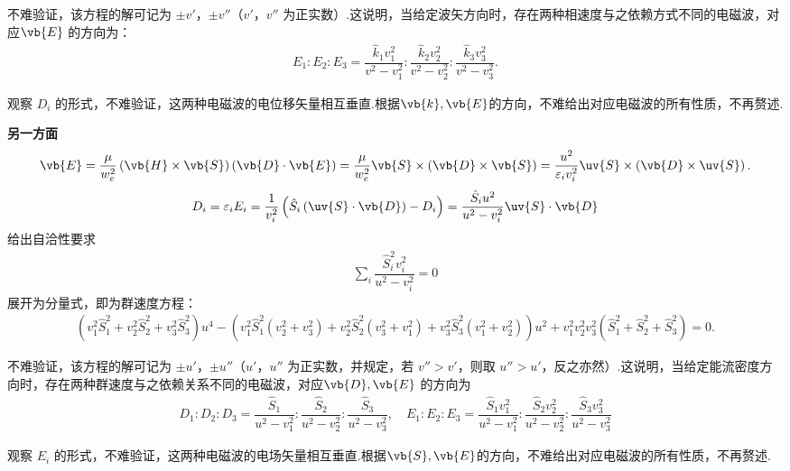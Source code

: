 不难验证，该方程的解可记为 \(\pm v'\)，\(\pm v''\)（\(v'\)，\(v''\) 为正实数）.这说明，当给定波矢方向时，存在两种相速度与之依赖方式不同的电磁波，对应\(\vb{E}\) 的方向为：
\begin{align*}
	E_1 : E_2 : E_3 = \dfrac{\hat{k}_1 v_1^2}{v^2 - v_1^2} : \dfrac{\hat{k}_2 v_2^2}{v^2 - v_2^2} : \dfrac{\hat{k}_3 v_3^2}{v^2 - v_3^2}.
\end{align*}

观察 \(D_i\) 的形式，不难验证，这两种电磁波的电位移矢量相互垂直.根据\(\vb{k},\vb{E}\)的方向，不难给出对应电磁波的所有性质，不再赘述.

\textbf{另一方面}
\begin{align*}
	\vb{E} = \dfrac{\mu}{w_e^2} \left( \vb{H} \times \vb{S} \right) \left( \vb{D} \cdot \vb{E} \right) = \dfrac{\mu}{w_e^2} \vb{S} \times \left( \vb{D} \times \vb{S} \right) = \dfrac{u^2}{\varepsilon_i v_i^2} \uv{S} \times \left( \vb{D} \times \uv{S} \right).
\end{align*}
\begin{align*}
	D_i = \varepsilon_i E_i = \dfrac{1}{v_i^2 }\left(\hat{S}_i\left(\uv{S}\cdot\vb{D}\right)-D_i\right)= \dfrac{\hat{S}_i u^2}{u^2 - v_i^2} \uv{S} \cdot \vb{D}
\end{align*}
给出自洽性要求
\begin{align*}
	\sum_i \dfrac{\hat{S}_i^2 v_i^2}{u^2 - v_i^2} = 0
\end{align*}
展开为分量式，即为群速度方程：
\begin{align*}
	\left( v_1^2 \hat{S}_1^2 + v_2^2 \hat{S}_2^2 + v_3^2 \hat{S}_3^2 \right) u^4 - \left( v_1^2 \hat{S}_1^2 \left(v_2^2 + v_3^2\right) + v_2^2 \hat{S}_2^2 \left(v_3^2 + v_1^2\right) + v_3^2 \hat{S}_3^2 \left(v_1^2 + v_2^2\right) \right) u^2 + v_1^2 v_2^2 v_3^2 \left( \hat{S}_1^2 + \hat{S}_2^2 + \hat{S}_3^2 \right) = 0.
\end{align*}

不难验证，该方程的解可记为 \(\pm u'\)，\(\pm u''\)（\(u'\)，\(u''\) 为正实数，并规定，若 \(v'' > v'\)，则取 \(u'' > u'\)，反之亦然）.这说明，当给定能流密度方向时，存在两种群速度与之依赖关系不同的电磁波，对应\(\vb{D},\vb{E}\) 的方向为
\begin{align*}
	D_1 : D_2 : D_3 = \dfrac{\hat{S}_1}{u^2 - v_1^2} : \dfrac{\hat{S}_2}{u^2 - v_2^2} : \dfrac{\hat{S}_3}{u^2 - v_3^2},\quad E_1 : E_2 : E_3 = \dfrac{\hat{S}_1 v_1^2}{u^2 - v_1^2} : \dfrac{\hat{S}_2 v_2^2}{u^2 - v_2^2} : \dfrac{\hat{S}_3 v_3^2}{u^2 - v_3^2}
\end{align*}

观察 \(E_i\) 的形式，不难验证，这两种电磁波的电场矢量相互垂直.根据\(\vb{S},\vb{E}\)的方向，不难给出对应电磁波的所有性质，不再赘述.

